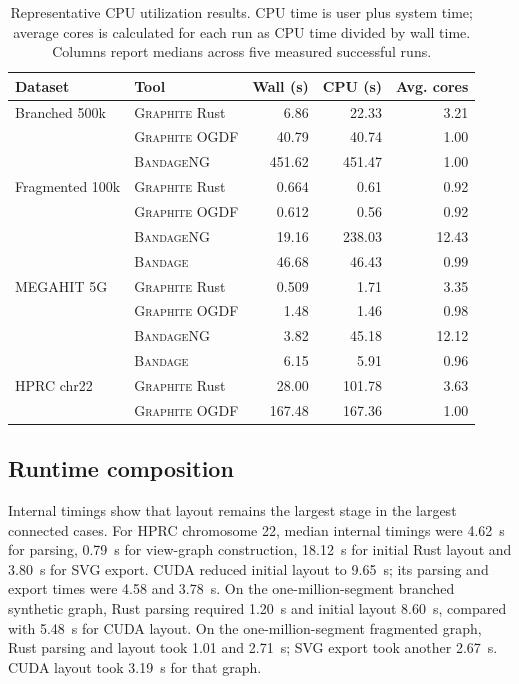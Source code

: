 \documentclass[11pt]{article}
\newcommand{\graphite}{\textsc{Graphite}\xspace}
\newcommand{\bandage}{\textsc{Bandage}\xspace}
\newcommand{\bandageng}{\textsc{BandageNG}\xspace}
\begin{document}
\begin{table}[ht]
\centering
\caption{Representative CPU utilization results. CPU time is user plus system time; average cores is calculated for each run as CPU time divided by wall time. Columns report medians across five measured successful runs.}
\label{tab:cpu}
\small
\begin{tabular}{llrrr}
\toprule
Dataset & Tool & Wall (s) & CPU (s) & Avg. cores\\
\midrule
Branched 500k & \graphite{} Rust & 6.86 & 22.33 & 3.21\\
               & \graphite{} OGDF & 40.79 & 40.74 & 1.00\\
               & \bandageng & 451.62 & 451.47 & 1.00\\
\addlinespace
Fragmented 100k & \graphite{} Rust & 0.664 & 0.61 & 0.92\\
                 & \graphite{} OGDF & 0.612 & 0.56 & 0.92\\
                 & \bandageng & 19.16 & 238.03 & 12.43\\
                 & \bandage & 46.68 & 46.43 & 0.99\\
\addlinespace
MEGAHIT 5G & \graphite{} Rust & 0.509 & 1.71 & 3.35\\
            & \graphite{} OGDF & 1.48 & 1.46 & 0.98\\
            & \bandageng & 3.82 & 45.18 & 12.12\\
            & \bandage & 6.15 & 5.91 & 0.96\\
\addlinespace
HPRC chr22 & \graphite{} Rust & 28.00 & 101.78 & 3.63\\
            & \graphite{} OGDF & 167.48 & 167.36 & 1.00\\
\bottomrule
\end{tabular}
\end{table}

\subsection{Runtime composition}
Internal timings show that layout remains the largest stage in the largest connected cases. For HPRC chromosome 22, median internal timings were 4.62~s for parsing, 0.79~s for view-graph construction, 18.12~s for initial Rust layout and 3.80~s for SVG export. CUDA reduced initial layout to 9.65~s; its parsing and export times were 4.58 and 3.78~s. On the one-million-segment branched synthetic graph, Rust parsing required 1.20~s and initial layout 8.60~s, compared with 5.48~s for CUDA layout. On the one-million-segment fragmented graph, Rust parsing and layout took 1.01 and 2.71~s; SVG export took another 2.67~s. CUDA layout took 3.19~s for that graph.
\end{document}
